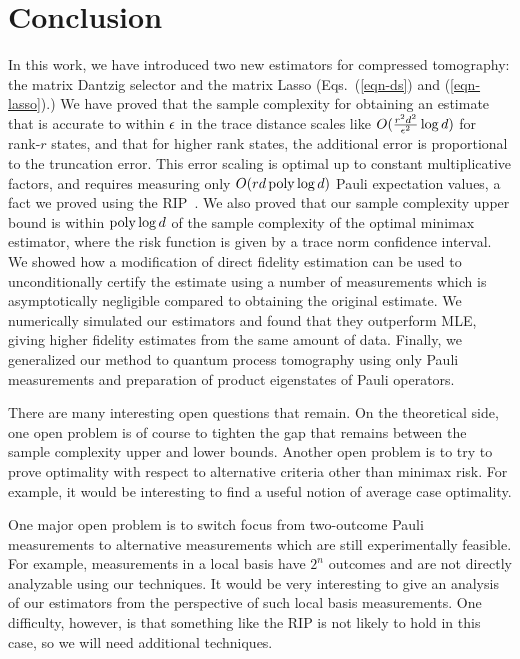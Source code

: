 


\section{Conclusion}\label{S:conclusion}


In this work, we have introduced two new estimators for compressed tomography: the matrix Dantzig selector and the matrix Lasso (Eqs.~(\ref{eqn-ds}) and (\ref{eqn-lasso}).) We have proved that the sample complexity for obtaining an estimate that is accurate to within $\epsilon$ in the trace distance scales like $O(\tfrac{r^2 d^2}{\epsilon^2} \log d)$ for rank-$r$ states, and that for higher rank states, the additional error is proportional to the truncation error. This error scaling is optimal up to constant multiplicative factors, and requires measuring only $O(r d \operatorname{poly}\log d)$ Pauli expectation values, a fact we proved using the RIP~\cite{Liu2011}. We also proved that our sample complexity upper bound is within $\operatorname{poly} \log d$ of the sample complexity of the optimal minimax estimator, where the risk function is given by a trace norm confidence interval. We showed how a modification of direct fidelity estimation can be used to unconditionally certify the estimate using a number of measurements which is asymptotically negligible compared to obtaining the original estimate. We numerically simulated our estimators and found that they outperform MLE, giving higher fidelity estimates from the same amount of data. Finally, we generalized our method to quantum process tomography using only Pauli measurements and preparation of product eigenstates of Pauli operators. 

There are many interesting open questions that remain. On the theoretical side, one open problem is of course to tighten the gap that remains between the sample complexity upper and lower bounds. Another open problem is to try to prove optimality with respect to alternative criteria other than minimax risk. For example, it would be interesting to find a useful notion of average case optimality. 

One major open problem is to switch focus from two-outcome Pauli measurements to alternative measurements which are still experimentally feasible. For example, measurements in a local basis have $2^n$ outcomes and are not directly analyzable using our techniques. It would be very interesting to give an analysis of our estimators from the perspective of such local basis measurements. One difficulty, however, is that something like the RIP is not likely to hold in this case, so we will need additional techniques.

